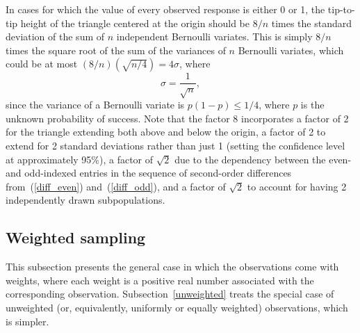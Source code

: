 \documentclass{article}
\begin{document}
In cases for which the value of every observed response is either 0 or 1,
the tip-to-tip height of the triangle centered at the origin should be $8/n$
times the standard deviation of the sum of $n$ independent Bernoulli variates.
This is simply $8/n$ times the square root of the sum of the variances
of $n$ Bernoulli variates, which could be at most
$(8/n)(\sqrt{n/4}) = 4\sigma$, where
%
\begin{equation}
\label{stddev}
\sigma = \frac{1}{\sqrt{n}},
\end{equation}
%
since the variance of a Bernoulli variate is $p(1-p) \le 1/4$,
where $p$ is the unknown probability of success.
Note that the factor 8 incorporates a factor of 2 for the triangle
extending both above and below the origin, a factor of 2 to extend
for 2 standard deviations rather than just 1
(setting the confidence level at approximately 95\%), a factor of $\sqrt{2}$
due to the dependency between the even- and odd-indexed entries
in the sequence of second-order differences from~(\ref{diff_even})
and~(\ref{diff_odd}), and a factor of $\sqrt{2}$ to account
for having 2 independently drawn subpopulations.


\subsection{Weighted sampling}
\label{weighted}

This subsection presents the general case in which the observations
come with weights, where each weight is a positive real number
associated with the corresponding observation.
Subsection~\ref{unweighted} treats the special case of unweighted
(or, equivalently, uniformly or equally weighted) observations,
which is simpler.
\end{document}
